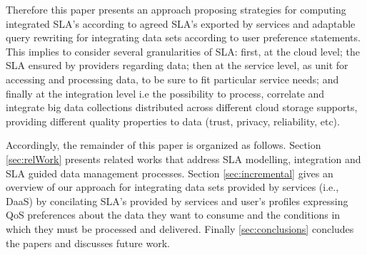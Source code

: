Therefore this paper presents an approach proposing strategies for computing integrated SLA’s according to agreed SLA’s exported by services  and adaptable query rewriting for integrating data sets  according to user preference statements.
This implies to consider several granularities of SLA: first, at the cloud level; the SLA ensured by providers regarding data; then at the service level, as unit for accessing and processing data, to be sure to fit particular service needs; and finally at the integration level i.e the possibility to process, correlate and integrate big data collections distributed across different cloud storage supports, providing different quality properties to data (trust, privacy, reliability, etc).
 
 


Accordingly, the remainder of this paper is organized as follows. Section \ref{sec:relWork} presents related works that address SLA modelling, integration and SLA guided data management processes. Section \ref{sec:incremental} gives an overview of our approach for integrating data sets provided by services (i.e., DaaS) by concilating SLA's provided by services and user's profiles expressing QoS preferences about the data they want to consume and the conditions in which they must be processed and delivered. 
Finally \ref{sec:conclusions} concludes the papers and discusses future work.